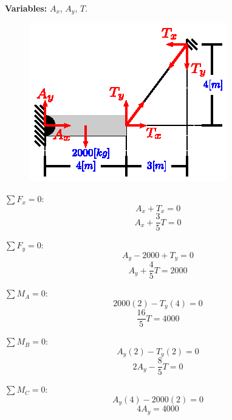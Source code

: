 \documentclass[letter,10pt,twoside]{article}
\begin{document}
\textbf{Variables:} $A_x$, $A_y$, $T$.
\\

\begin{figure}[H]
\centering
\includegraphics[scale=1.8]{resources/h04.eps}
\end{figure}

$\sum{F_x} = 0$:
\begin{equation*}
    A_x + T_x = 0
\end{equation*}
\begin{equation*}
    A_x + \frac{3}{5} T = 0
\end{equation*}

$\sum{F_y} = 0$:
\begin{equation*}
    A_y - 2000 + T_y = 0
\end{equation*}
\begin{equation*}
    A_y + \frac{4}{5} T = 2000
\end{equation*}

$\sum{M_A} = 0$:
\begin{equation*}
    2000(2) - T_y(4) = 0
\end{equation*}
\begin{equation*}
    \frac{16}{5} T = 4000
\end{equation*}

$\sum{M_B} = 0$:
\begin{equation*}
    A_y(2) - T_y(2) = 0
\end{equation*}
\begin{equation*}
    2 A_y - \frac{8}{5} T = 0
\end{equation*}

$\sum{M_C} = 0$:
\begin{equation*}
    A_y(4) - 2000(2) = 0
\end{equation*}
\begin{equation*}
    4 A_y = 4000
\end{equation*}
\end{document}
